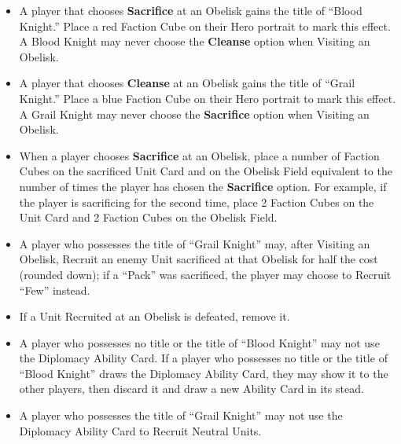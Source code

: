\begin{multicols*}{2}
\begin{itemize}
\begin{enumerate}[leftmargin=15pt]
\begin{enumerate}
      \item *: Gain 18 , 9 , and 3 . Additionally, \textbf{Search (2)} the Relic Card Deck. Finally, if the Unit Card was on the ``Pack'' side, \textbf{Search (2)} the  Unit Deck; you may Recruit one of these Units for half the cost (rounded down).
    \end{enumerate}
  \end{enumerate}
  \item A player that chooses \textbf{Sacrifice} at an Obelisk gains the title of ``\textcolor{darkcandyapplered}{Blood Knight}.'' Place a red Faction Cube on their Hero portrait to mark this effect. A \textcolor{darkcandyapplered}{Blood Knight} may never choose the \textbf{Cleanse} option when Visiting an Obelisk.
  \item A player that chooses \textbf{Cleanse} at an Obelisk gains the title of ``\textcolor{cobalt}{Grail Knight}.'' Place a blue Faction Cube on their Hero portrait to mark this effect. A \textcolor{cobalt}{Grail Knight} may never choose the \textbf{Sacrifice} option when Visiting an Obelisk.
  \item When a player chooses \textbf{Sacrifice} at an Obelisk, place a number of Faction Cubes on the sacrificed Unit Card and on the Obelisk Field equivalent to the number of times the player has chosen the \textbf{Sacrifice} option. For example, if the player is sacrificing for the second time, place 2 Faction Cubes on the Unit Card and 2 Faction Cubes on the Obelisk Field.
  \item A player who possesses the title of ``\textcolor{cobalt}{Grail Knight}'' may, after Visiting an Obelisk, Recruit an enemy Unit sacrificed at that Obelisk for half the cost (rounded down); if a ``Pack'' was sacrificed, the player may choose to Recruit ``Few'' instead.
  \item If a Unit Recruited at an Obelisk is defeated, remove it.
  \item A player who possesses no title or the title of ``\textcolor{darkcandyapplered}{Blood Knight}'' may not use the Diplomacy Ability Card. If a player who possesses no title or the title of ``\textcolor{darkcandyapplered}{Blood Knight}'' draws the Diplomacy Ability Card, they may show it to the other players, then discard it and draw a new Ability Card in its stead.
  \item A player who possesses the title of ``\textcolor{cobalt}{Grail Knight}'' may not use the Diplomacy Ability Card to Recruit Neutral  Units.

\end{itemize}
\end{multicols*}
